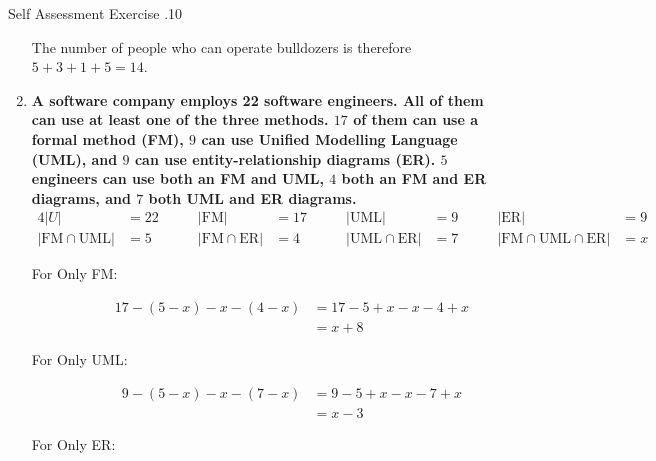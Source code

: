 \documentclass[../notes.tex]{subfiles}
\begin{document}
\begin{exercise}{Self Assessment Exercise \thechapter.10}
\begin{enumerate}
							The number of people who can operate bulldozers is therefore $5 + 3 + 1 + 5 = 14$.
						\item \textbf{A software company employs 22 software engineers. All of them can use at least one of the three methods. $17$ of them can use a formal method (FM), $9$ can use Unified Modelling Language (UML), and $9$ can use entity-relationship diagrams (ER). $5$ engineers can use both an FM and UML, $4$ both an FM and ER diagrams, and $7$ both UML and ER diagrams.}
						\begin{alignat*}{4}
							\left\lvert U\right\rvert &= 22 \qquad & \left\lvert \mathrm{FM}\right\rvert&= 17 \qquad & \left\lvert \mathrm{UML}\right\rvert &= 9 \qquad & \left\lvert \mathrm{ER}\right\rvert &= 9 \\
							\left\lvert \mathrm{FM} \cap \mathrm{UML}\right\rvert &= 5 \qquad & \left\lvert \mathrm{FM} \cap \mathrm{ER}\right\rvert &= 4 \qquad & \left\lvert \mathrm{UML} \cap \mathrm{ER}\right\rvert &= 7 \qquad & \left\lvert \mathrm{FM} \cap \mathrm{UML} \cap \mathrm{ER}\right\rvert &= x  
						\end{alignat*}
						\begin{center}
							\begin{venndiagram3sets}[showframe=true, radius=3.5cm, overlap=2.3cm, labelA={FM}, labelB={UML}, labelC={ER}, labelABC={$x$}, labelOnlyAB={$5 - x$}, labelOnlyAC={$4 - x$}, labelOnlyBC={$7 - x$}, labelOnlyA={$x + 8$}, labelOnlyB={$x - 3$}, labelOnlyC={$x - 2$}]
								\fillAll[fill=white]
							\end{venndiagram3sets}
						\end{center}
						\begin{description}
							\item[For Only FM:] \rule{0pt}{11pt} \vspace*{-23pt}
								\begin{align*}
									17 - (5 - x) - x - (4 - x) &= 17 - 5 + x - x - 4 + x\\
									&= x + 8
								\end{align*}
							\item[For Only UML:] \rule{0pt}{11pt} \vspace*{-23pt}
								\begin{align*}
									9 - (5 - x) - x - (7 - x) &= 9 - 5 + x - x - 7 + x\\
									&= x - 3
								\end{align*}
							\item[For Only ER:] \rule{0pt}{11pt} \vspace*{-23pt}

\end{description}
\end{enumerate}
\end{exercise}
\end{document}
